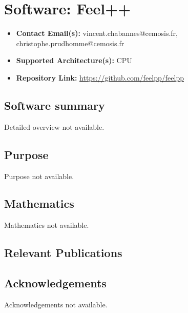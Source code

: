 \section{Software: Feel++}
\label{sec:Feel++:software}



\begin{itemize}
    \item \textbf{Contact Email(s):} vincent.chabannes@cemosis.fr, christophe.prudhomme@cemosis.fr
    \item \textbf{Supported Architecture(s):} CPU
    \item \textbf{Repository Link:} \href{https://github.com/feelpp/feelpp}{https://github.com/feelpp/feelpp}
\end{itemize}

\subsection{Software summary}
\label{sec:Feel++:summary}
Detailed overview not available.



\subsection{Purpose}
\label{sec:Feel++:purpose}
Purpose not available.



\subsection{Mathematics}
\label{sec:Feel++:mathematics}
Mathematics not available.


\subsection{Relevant Publications}
\label{sec:Feel++:publications}

\subsection{Acknowledgements}
\label{sec::Feel++:acknowledgements}

Acknowledgements not available.


